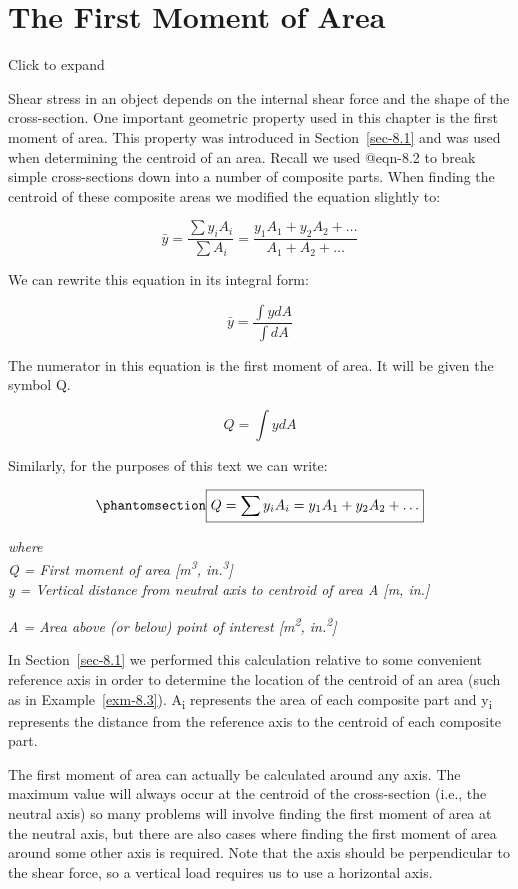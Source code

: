 \documentclass[
  letterpaper,
  DIV=11,
  numbers=noendperiod]{scrreprt}
\theoremstyle{definition}
\theoremstyle{remark}
\begin{document}
\section{The First Moment of Area}\label{sec-10.1}

Click to expand

Shear stress in an object depends on the internal shear force and the
shape of the cross-section. One important geometric property used in
this chapter is the first moment of area. This property was introduced
in Section~\ref{sec-8.1} and was used when determining the centroid of
an area. Recall we used @eqn-8.2 to break simple cross-sections down
into a number of composite parts. When finding the centroid of these
composite areas we modified the equation slightly to:

\[
\bar{y}=\frac{\sum y_i A_i}{\sum A_i}=\frac{y_1 A_1+y_2 A_2+\ldots}{A_1+A_2+\ldots}
\]

We can rewrite this equation in its integral form:

\[
\bar{y}=\frac{\int y d A}{\int d A}
\]

The numerator in this equation is the first moment of area. It will be
given the symbol Q.

\[
Q=\int y d A
\]

Similarly, for the purposes of this text we can write:

\begin{equation}\phantomsection\label{eq-10.1}{
\boxed{Q=\sum y_i A_i=y_1 A_1+y_2 A_2+\ldots}
}\end{equation}

\emph{where}\\
\emph{Q = First moment of area {[}m\textsuperscript{3},
in.\textsuperscript{3}{]}}\\
\emph{y = Vertical distance from neutral axis to centroid of area A
{[}m, in.{]}}

\emph{A = Area above (or below) point of interest
{[}m\textsuperscript{2}, in.\textsuperscript{2}{]}}

In Section~\ref{sec-8.1} we performed this calculation relative to some
convenient reference axis in order to determine the location of the
centroid of an area (such as in Example~\ref{exm-8.3}).
A\textsubscript{i} represents the area of each composite part and
y\textsubscript{i} represents the distance from the reference axis to
the centroid of each composite part.

The first moment of area can actually be calculated around any axis. The
maximum value will always occur at the centroid of the cross-section
(i.e., the neutral axis) so many problems will involve finding the first
moment of area at the neutral axis, but there are also cases where
finding the first moment of area around some other axis is required.
Note that the axis should be perpendicular to the shear force, so a
vertical load requires us to use a horizontal axis.
\end{document}
